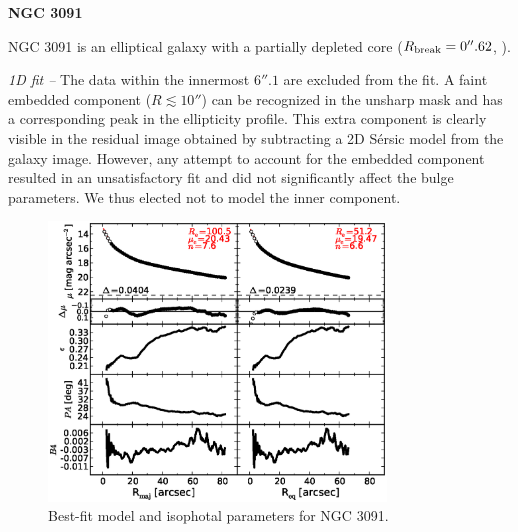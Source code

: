 \documentclass[preprint2]{emulateapj}
\newcommand{\fitfigurewidth}{0.8\textwidth}
\begin{document}
  \clearpage\newpage\noindent
  {\bf NGC 3091 \\}

  NGC 3091 is an elliptical galaxy with a partially depleted core ($R_{\rm break} = 0''.62$, \citealt{rusli2013}).


  \emph{1D fit -- }
  The data within the innermost $6''.1$ are excluded from the fit.
  A faint embedded component ($R \lesssim 10''$) can be recognized in the unsharp mask and has a corresponding peak in the
  ellipticity profile.
  This extra component is clearly visible in the residual image obtained by subtracting a 2D S\'ersic model from the  
  galaxy image.
  However, any attempt to account for the embedded component resulted in an unsatisfactory fit and did not 
  significantly affect the bulge parameters.
  We thus elected not to model the inner component.

  \begin{figure}[h]
  \begin{center}
  \includegraphics[width=\fitfigurewidth]{images/n3091_1Dfit.eps}
  \caption{Best-fit model and isophotal parameters for NGC 3091.}
  \end{center}
  \end{figure}
\end{document}

